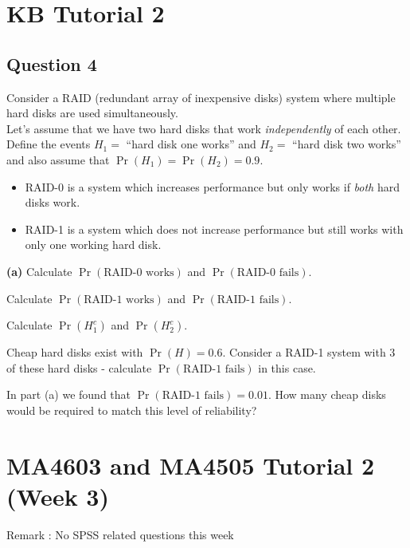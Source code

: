 
\section{KB Tutorial 2}

\subsection*{Question 4}
Consider a RAID (redundant array of inexpensive disks) system where multiple hard disks are used simultaneously.\\[0.2cm]
Let's assume that we have two hard disks that work \emph{independently} of each other. Define the events $H_1 =$ ``hard disk one works'' and $H_2 =$ ``hard disk two works'' and also assume that $\Pr(H_1) = \Pr(H_2) = 0.9$.\\ \smallskip
\begin{itemize}
	\item RAID-0 is a system which increases performance but only works if \emph{both} hard disks work.
	\item RAID-1 is a system which does not increase performance but still works with only one working hard disk.
\end{itemize}

{\bf(a)} Calculate $\Pr(\text{RAID-0 works})$ and $\Pr(\text{RAID-0 fails})$. \\[0.3cm] 
 \item  Calculate $\Pr(\text{RAID-1 works})$ and $\Pr(\text{RAID-1 fails})$. 
 \item  Calculate $\Pr(H_1^c)$ and $\Pr(H_2^c)$. \\[0.3cm]

 \item  Cheap hard disks exist with $\Pr(H) = 0.6$. Consider a RAID-1 system with 3 of these hard disks - calculate $\Pr(\text{RAID-1 fails})$ in this case. \\[0.3cm] 
 \item  In part (a) we found that $\Pr(\text{RAID-1 fails}) = 0.01$. How many cheap disks would be required to match this level of reliability?




\newpage
\section*{MA4603 and MA4505 Tutorial 2 (Week 3)}
Remark : No SPSS related questions this week 



